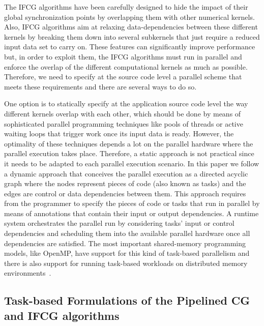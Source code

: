 The IFCG algorithms have been carefully designed to hide the impact of their global synchronization points by overlapping them with other numerical kernels.
Also, IFCG algorithms aim at relaxing data-dependencies between these different kernels by breaking them down into several subkernels that just require a reduced input data set to carry on.
These features can significantly improve performance but, in order to exploit them,
the IFCG algorithms must run in parallel and enforce the overlap of the different computational kernels as much as possible.
Therefore, we need to specify at the source code level a parallel scheme that meets these requirements
and there are several ways to do so. 

One option is to statically specify at the application source code level the way different kernels overlap with each other, which should be done by means of sophisticated parallel programming techniques like pools of threads or active waiting loops that trigger work once its input data is ready.
However, the optimality of these techniques depends a lot on the parallel hardware where the parallel execution takes place.
Therefore, a static approach is not practical since it needs to be adapted to each parallel execution scenario.
In this paper we follow a dynamic approach that conceives the parallel execution as a directed acyclic graph where the nodes represent pieces of code (also known as tasks) and the edges are control or data dependencies between them.
This approach requires from the programmer to specify the pieces of code or tasks that run in parallel by means of annotations that contain their input or output dependencies.
A runtime system orchestrates the parallel run by considering tasks' input or control dependencies and scheduling them into the available parallel hardware once all dependencies are satisfied.
The most important shared-memory programming models, like OpenMP, have support for this kind of task-based parallelism
and there is also support for running task-based workloads on distributed memory environments~\cite{Bueno13}. 

\subsection{Task-based Formulations of the Pipelined CG and IFCG algorithms} 
\label{sec:ifcg_task}

